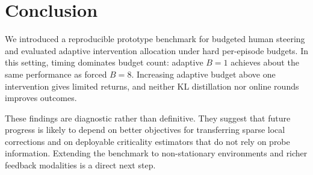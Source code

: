 \documentclass{article}
\begin{document}
\section{Conclusion}
We introduced a reproducible prototype benchmark for budgeted human steering and evaluated adaptive intervention allocation under hard per-episode budgets. In this setting, timing dominates budget count: adaptive $B{=}1$ achieves about the same performance as forced $B{=}8$. Increasing adaptive budget above one intervention gives limited returns, and neither KL distillation nor online rounds improves outcomes.

These findings are diagnostic rather than definitive. They suggest that future progress is likely to depend on better objectives for transferring sparse local corrections and on deployable criticality estimators that do not rely on probe information. Extending the benchmark to non-stationary environments and richer feedback modalities is a direct next step.
\end{document}
